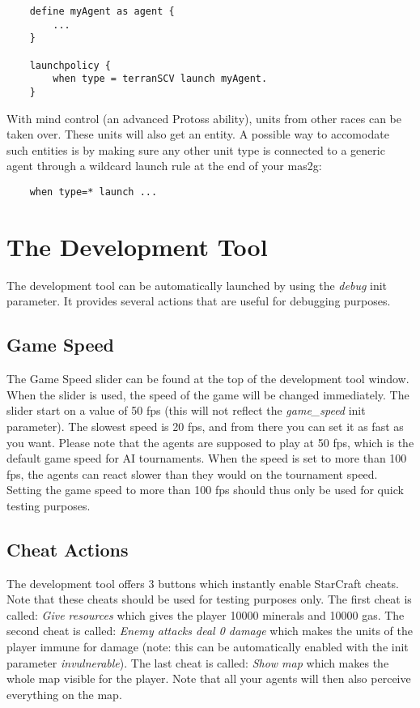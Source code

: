 \begin{verbatim}
    define myAgent as agent {
        ...
    }

    launchpolicy {
        when type = terranSCV launch myAgent.
    }
\end{verbatim}

With mind control (an advanced Protoss ability), units from other races can be taken over. These units will also get an entity. A possible way to accomodate such entities is by making sure any other unit type is connected to a generic agent through a wildcard launch rule at the end of your mas2g: \begin{verbatim}
    when type=* launch ...
\end{verbatim}

\newpage

\section{The Development Tool}
\label{development tool}
The development tool can be automatically launched by using the \textit{debug} init parameter. It provides several actions that are useful for debugging purposes.

\subsection{Game Speed}
The Game Speed slider can be found at the top of the development tool window. When the slider is used, the speed of the game will be changed immediately. The slider start on a value of 50 fps (this will not reflect the \textit{game\_speed} init parameter). The slowest speed is 20 fps, and from there you can set it as fast as you want. Please note that the agents are supposed to play at 50 fps, which is the default game speed for AI tournaments. When the speed is set to more than 100 fps, the agents can react slower than they would on the tournament speed. Setting the game speed to more than 100 fps should thus only be used for quick testing purposes.

\subsection{Cheat Actions}
The development tool offers 3 buttons which instantly enable StarCraft cheats. Note that these cheats should be used for testing purposes only. The first cheat is called: \textit{Give resources} which gives the player 10000 minerals and 10000 gas. The second cheat is called: \textit{Enemy attacks deal 0 damage} which makes the units of the player immune for damage (note: this can be automatically enabled with the init parameter \textit{invulnerable}). The last cheat is called: \textit{Show map} which makes the whole map visible for the player. Note that  all your agents will then also perceive everything on the map.


